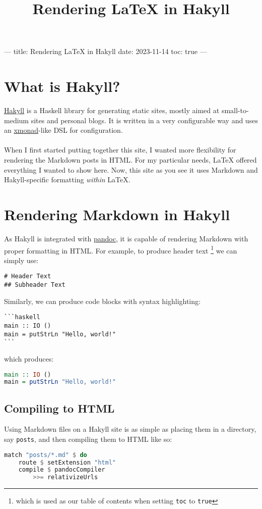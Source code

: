 ---
title: Rendering LaTeX in Hakyll
date: 2023-11-14
toc: true
---

\usepackage{listings}
\usepackage{hyperref}

\newtheorem{theorem}{Theorem}
\newtheorem{corollary}[theorem]{Corollary}
\newtheorem{lemma}[theorem]{Lemma}
\theoremstyle{definition}
\newtheorem{definition}[theorem]{Definition}
\theoremstyle{remark}
\newtheorem{remark}{Remark}

\title{Rendering LaTeX in Hakyll}

\section{What is Hakyll?}
\href{https://jaspervdj.be/hakyll/}{Hakyll} is a Haskell library for generating static sites, mostly aimed at small-to-medium sites and personal blogs.
It is written in a very configurable way and uses an \href{https://xmonad.org/}{xmonad}-like DSL for configuration. \\
\\
When I first started putting together this site, I wanted more flexibility for rendering the Markdown posts in HTML.
For my particular needs, LaTeX offered everything I wanted to show here.
Now, this site as you see it uses Markdown and Hakyll-specific formatting \textit{within} LaTeX.

\section{Rendering Markdown in Hakyll}
As Hakyll is integrated with \href{https://pandoc.org/}{pandoc}, it is capable of rendering Markdown with proper formatting in HTML.
For example, to produce header text \footnote{which is used as our table of contents when setting \texttt{toc} to \texttt{true}} we can simply use:
\begin{verbatim}
# Header Text
## Subheader Text
\end{verbatim}
Similarly, we can produce code blocks with syntax highlighting:
\begin{verbatim}
```haskell
main :: IO ()
main = putStrLn "Hello, world!"
```
\end{verbatim}
which produces:
\begin{lstlisting}[language=haskell]
main :: IO ()
main = putStrLn "Hello, world!"
\end{lstlisting}

\subsection{Compiling to HTML}
Using Markdown files on a Hakyll site is as simple as placing them in a directory, say \texttt{posts}, and then compiling them to HTML like so:
\begin{lstlisting}[language=haskell]
match "posts/*.md" $ do
    route $ setExtension "html"
    compile $ pandocCompiler
        >>= relativizeUrls
\end{lstlisting}

